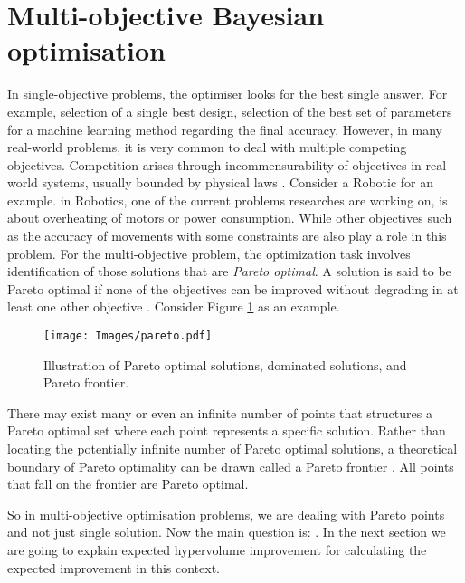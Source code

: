 \section{Multi-objective Bayesian optimisation}
In single-objective problems, the optimiser looks for the best single answer. For example, selection of a single best design, selection of the best set of parameters for a machine learning method regarding the final accuracy. However, in many real-world problems, it is very common to deal with multiple competing objectives. Competition arises through incommensurability of objectives in real-world systems, usually bounded by physical laws \cite{rousis2011pareto}. Consider a Robotic for an example. in Robotics, one of the current problems researches are working on, is about overheating of motors or power consumption. While other objectives such as the accuracy of movements with some constraints are also play a role in this problem.
For the multi-objective problem, the optimization task involves identification of those solutions that are \textit{Pareto optimal}. A solution is said to be Pareto optimal if none of the objectives can be improved without degrading in at least one other objective \cite{rousis2011pareto}. Consider Figure \ref{fig:par} as an example.
\begin{figure}[h]
\centering
\texttt{[image: Images/pareto.pdf]}
\caption{Illustration of Pareto optimal solutions, dominated solutions, and Pareto frontier.}
\label{fig:par}
\end{figure}
There may exist many or even an infinite number of points that structures a Pareto optimal set where each point represents a specific solution. Rather than locating the potentially infinite number of Pareto optimal solutions, a theoretical boundary of Pareto optimality can be drawn called a Pareto frontier \cite{rousis2011pareto}. All points that fall on the frontier are Pareto optimal. 
\par
So in multi-objective optimisation problems, we are dealing with Pareto points and not just single solution. Now the main question is: . In the next section we are going to explain expected hypervolume improvement for calculating the expected improvement in this context.

